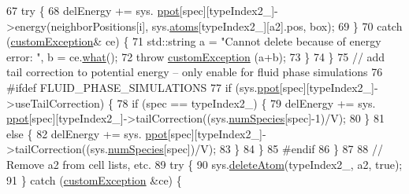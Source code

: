 \begin{DoxyCode}
67             \textcolor{keywordflow}{try} \{
68                                                                 delEnergy += sys.
      \hyperlink{classsim_system_a8d6271751a62f61edcf57f773540a4a3}{ppot}[spec][typeIndex2\_]->energy(neighborPositions[i], sys.\hyperlink{classsim_system_a90421b19082f7fb8fc23b7264b1161e4}{atoms}[typeIndex2\_][a2].pos, box);
69                                                 \}
70                                                 \textcolor{keywordflow}{catch} (\hyperlink{classcustom_exception}{customException}& ce) \{
71                                                                 std::string a = \textcolor{stringliteral}{"Cannot delete because of
       energy error: "}, b = ce.\hyperlink{classcustom_exception_aeb6ab5848b038adfc68fde86a512f691}{what}();
72                                                                 \textcolor{keywordflow}{throw} 
      \hyperlink{classcustom_exception}{customException} (a+b);
73                                                 \}
74         \}
75         \textcolor{comment}{// add tail correction to potential energy -- only enable for fluid phase simulations}
76 \textcolor{preprocessor}{#ifdef FLUID\_PHASE\_SIMULATIONS}
77         \textcolor{keywordflow}{if} (sys.\hyperlink{classsim_system_a8d6271751a62f61edcf57f773540a4a3}{ppot}[spec][typeIndex2\_]->useTailCorrection) \{
78                 \textcolor{keywordflow}{if} (spec == typeIndex2\_) \{
79                                                                 delEnergy += sys.
      \hyperlink{classsim_system_a8d6271751a62f61edcf57f773540a4a3}{ppot}[spec][typeIndex2\_]->tailCorrection((sys.\hyperlink{classsim_system_a9eea865e6dc1cff377b1e79c4d9c23f0}{numSpecies}[spec]-1)/V);
80                                                 \}
81                                                 \textcolor{keywordflow}{else} \{
82                                                                 delEnergy += sys.
      \hyperlink{classsim_system_a8d6271751a62f61edcf57f773540a4a3}{ppot}[spec][typeIndex2\_]->tailCorrection((sys.\hyperlink{classsim_system_a9eea865e6dc1cff377b1e79c4d9c23f0}{numSpecies}[spec])/V);
83                                                 \}
84                                 \}
85 \textcolor{preprocessor}{#endif}
86     \}
87 
88     \textcolor{comment}{// Remove a2 from cell lists, etc.}
89     \textcolor{keywordflow}{try} \{
90                 sys.\hyperlink{classsim_system_acabf4fc5b5b90bba62e1449ddb3646c6}{deleteAtom}(typeIndex2\_, a2, \textcolor{keyword}{true});
91     \} \textcolor{keywordflow}{catch} (\hyperlink{classcustom_exception}{customException} &ce) \{

\end{DoxyCode}
